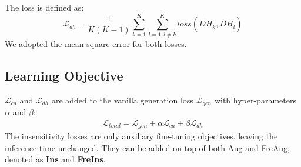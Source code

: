The loss is defined as:
\begin{equation}
	\mathcal{L}_{dh} = \frac{1}{K(K-1)} \sum_{k=1}^{K}\sum_{l=1, l\neq k}^{K} loss(\widetilde{DH}_k, \widetilde{DH}_l)
\end{equation}
We adopted the mean square error for both losses.

\subsection{Learning Objective}


$\mathcal{L}_{ca}$ and $\mathcal{L}_{dh}$ are added to the vanilla generation loss $\mathcal{L}_{gen}$ with hyper-parameters $\alpha$ and $\beta$: %
\begin{equation}
	\begin{aligned}
		\mathcal{L}_{total} = \mathcal{L}_{gen} + \alpha \mathcal{L}_{ca} + \beta \mathcal{L}_{dh}
	\end{aligned}
\end{equation}
The insensitivity losses are only auxiliary fine-tuning objectives, leaving the inference time unchanged. They can be added on top of both Aug and FreAug, denoted as \textbf{Ins} and \textbf{FreIns}.


